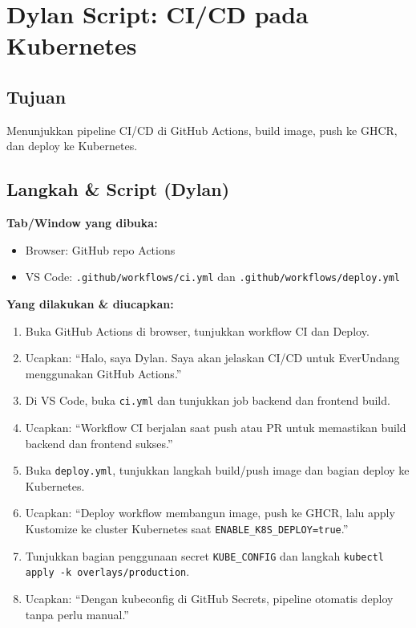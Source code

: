 \documentclass[11pt,a4paper]{article}
\begin{document}
\section{Dylan Script: CI/CD pada Kubernetes}
\subsection*{Tujuan}
Menunjukkan pipeline CI/CD di GitHub Actions, build image, push ke GHCR, dan deploy ke Kubernetes.

\subsection*{Langkah \& Script (Dylan)}
\textbf{Tab/Window yang dibuka:}
\begin{itemize}
  \item Browser: GitHub repo \textrm{Actions}
  \item VS Code: \texttt{.github/workflows/ci.yml} dan \texttt{.github/workflows/deploy.yml}
\end{itemize}

\textbf{Yang dilakukan \& diucapkan:}
\begin{enumerate}
  \item Buka GitHub Actions di browser, tunjukkan workflow CI dan Deploy.
  \item Ucapkan:
  “Halo, saya Dylan. Saya akan jelaskan CI/CD untuk EverUndang menggunakan GitHub Actions.”

  \item Di VS Code, buka \texttt{ci.yml} dan tunjukkan job backend dan frontend build.
  \item Ucapkan:
  “Workflow CI berjalan saat push atau PR untuk memastikan build backend dan frontend sukses.”

  \item Buka \texttt{deploy.yml}, tunjukkan langkah build/push image dan bagian deploy ke Kubernetes.
  \item Ucapkan:
  “Deploy workflow membangun image, push ke GHCR, lalu apply Kustomize ke cluster Kubernetes saat \texttt{ENABLE\_K8S\_DEPLOY=true}.”

  \item Tunjukkan bagian penggunaan secret \texttt{KUBE\_CONFIG} dan langkah \texttt{kubectl apply -k overlays/production}.
  \item Ucapkan:
  “Dengan kubeconfig di GitHub Secrets, pipeline otomatis deploy tanpa perlu manual.”
\end{enumerate}
\end{document}
